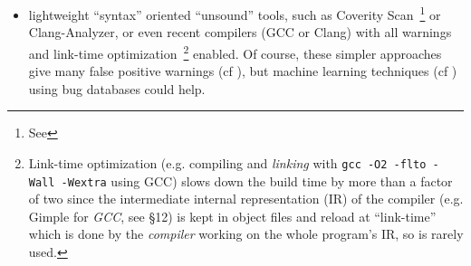 \begin{itemize}
    lines of C code (following some \emph{particular} coding style or
    using some definable \emph{subset} of the C language\footnote{For
      instance, both \emph{Frama-C} and \emph{Astrée} have issues in
      dealing with standard dynamic C memory allocation above
      \texttt{malloc}; since they target above all the safety critical
      real-time embedded software market where such allocations are
      \emph{forbidden}.}). Some formal analysis approaches include a
    definition of a strict subset of \emph{C}, thru perhaps some
    automatically generated code (cf. \cite{Bhargavan:DFHPRR17}) from
    some DSL.  In practice, the formal sound static analyzers are able
    to prove \emph{automatically} some \emph{simple} properties of
    small, highly critical, software components (e.g. avoiding the
    need of \emph{unit testing} at the expense of very \emph{costly
      software development efforts}).

  \item lightweight ``syntax'' oriented ``unsound'' tools, such as
    Coverity Scan~\footnote{See } or
    Clang-Analyzer, or even recent compilers (GCC or Clang) with all
    warnings and link-time optimization~\footnote{Link-time
      optimization (e.g. compiling and \emph{linking} with \texttt{gcc
        -O2 -flto -Wall -Wextra} using GCC) slows down the build time by more than a
      factor of two since the intermediate internal representation (IR) of the
      compiler (e.g. Gimple  for \emph{GCC}, see \cite{gcc-internals} \S{12}) is kept in object files and
      reload at ``link-time'' which is done by the \emph{compiler}
      working on the whole program's IR, so is rarely used.}  enabled. Of
    course, these simpler approaches give many false positive warnings
    (cf \cite{Nadeem:2012:HFP}), but machine learning techniques (cf
    \cite{Perl:2015:VFP, flach:2012:machine-learning}) using bug databases could help.
    
\end{itemize}

